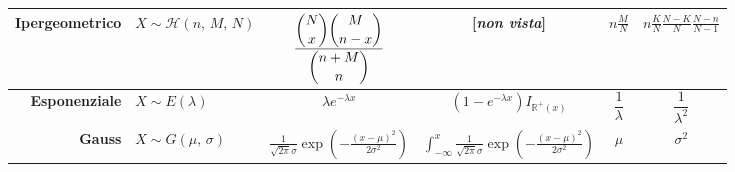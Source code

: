 \documentclass[border=2pt]{standalone}
\begin{document}
\begin{table}[p]
\begin{tabular}{r|l||c|c|c|c}
    \hline \phantom{$\displaystyle  \sum_{i=0}^{\lfloor x \rfloor}$} 
    \textbf{Ipergeometrico} & $X \sim \mathcal H{(n, \, M, \, N)}$ & $\displaystyle \frac{\dbinom{N}{x} \dbinom{M}{n-x}}{{\dbinom {n+M}{n}}}$ & [\textit{non vista}] & $\displaystyle n \frac M N$ & $\displaystyle n \frac K N \frac{N-K}{N} \frac{N-n}{N-1}$ \\
    \hline \phantom{$\displaystyle  \sum_{i=0}^{\lfloor x \rfloor}$}
    \textbf{Esponenziale} & $X \sim E{(\lambda)}$ & $\lambda e^{-\lambda x}$ & $(1-e^{-\lambda x}) I_{\mathbb R^+ (x)}$ & $\dfrac 1 \lambda$ & $\dfrac {1}{\lambda^2}$ \\
    \hline \phantom{$\displaystyle  \sum_{i=0}^{\lfloor x \rfloor}$}
    \textbf{Gauss} & $X \sim G{(\mu, \, \sigma)}$ & $\displaystyle \frac{1}{\sqrt{2 \pi} \sigma} \exp{\!\left(-\frac{(x-\mu)^2}{2\sigma^2} \right)}$ & $\displaystyle \int_{-\infty}^{x} \frac{1}{\sqrt{2 \pi} \sigma} \exp{\!\left(-\frac{(x-\mu)^2}{2\sigma^2} \right)}$ & $\mu$ & $\sigma^2$ 
\end{tabular}
\end{table}
\end{document}
